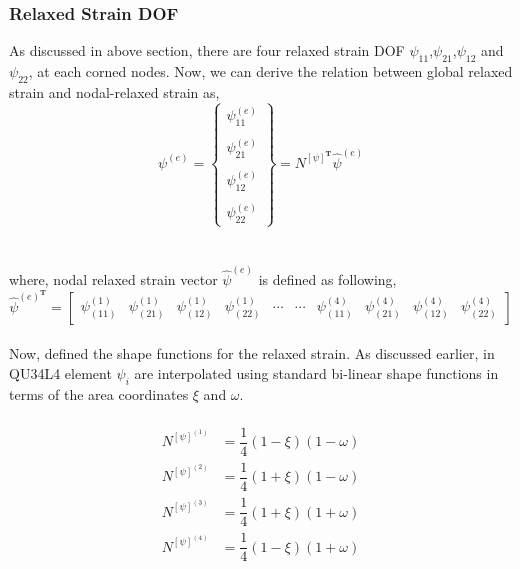 \documentclass[12pt]{article}
\begin{document}
\subsubsection{ Relaxed Strain DOF}
As discussed in above section, there are four relaxed strain DOF $\psi_{11}$,$\psi_{21}$,$\psi_{12}$ and $\psi_{22}$,  at each corned nodes. Now, we can derive the relation between global relaxed strain and nodal-relaxed strain as,
\\
\begin{equation}\label{fourfive}
\psi^{(e)}=
\begin{Bmatrix}
\psi_{11}^{(e)} \\
\\
\psi_{21}^{(e)} \\
\\
\psi_{12}^{(e)} \\
\\
\psi_{22}^{(e)}
\end{Bmatrix}
=N^{[\psi]^{\textbf{T}}} \hat{\psi}^{(e)}
\end{equation}
\\
\\
where, nodal relaxed strain vector $\hat{\psi}^{(e)}$ is defined as following,
\begin{equation}\label{foursix}
\hat{\psi}^{(e)^{\textbf{T}}}=
\begin{bmatrix}
\psi_{(11)}^{(1)}&\psi_{(21)}^{(1)}&\psi_{(12)}^{(1)}&\psi_{(22)}^{(1)}&\cdots &\cdots& \psi_{(11)}^{(4)}&\psi_{(21)}^{(4)}&\psi_{(12)}^{(4)}&\psi_{(22)}^{(4)}
\end{bmatrix}
\end{equation}
\\
Now, defined the shape functions for the relaxed strain. As discussed earlier, in QU34L4 element $\psi_i$ are interpolated using standard bi-linear shape functions in terms of the area coordinates $\xi$ and $\omega$.
\\
\\
\begin{equation}\label{fourseven}
\begin{aligned}
N^{[\psi]^{(1)}} &= \dfrac{1}{4}(1-\xi)(1-\omega) \\
N^{[\psi]^{(2)}} &= \dfrac{1}{4}(1+\xi)(1-\omega) \\ 
N^{[\psi]^{(3)}} &= \dfrac{1}{4}(1+\xi)(1+\omega) \\
N^{[\psi]^{(4)}} &= \dfrac{1}{4}(1-\xi)(1+\omega) \\
\end{aligned}
\end{equation}
\end{document}

